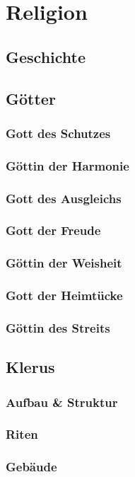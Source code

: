 \chapter{Religion}
\section{Geschichte}
\section{Götter}
\subsection{Gott des Schutzes}
\subsection{Göttin der Harmonie}
\subsection{Gott des Ausgleichs}
\subsection{Gott der Freude}
\subsection{Göttin der Weisheit}
\subsection{Gott der Heimtücke}
\subsection{Göttin des Streits}

\section{Klerus}
\subsection{Aufbau \& Struktur}
\subsection{Riten}
\subsection{Gebäude}
